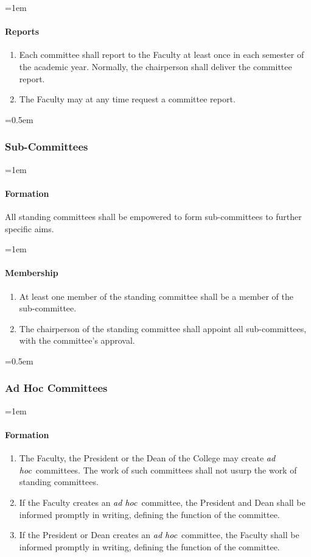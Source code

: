 \documentclass{manual}
\newcommand{\keyword}[1]{\textcolor{black}{#1}}
\newcommand{\adho}{\keyword{\textit{ad hoc}}~}
\let\oldsubsubsection\subsubsection
\renewcommand\subsubsection{\leftskip=0.5em\oldsubsubsection}
\let\oldparagraph\paragraph
\renewcommand\paragraph{\leftskip=1em\oldparagraph}
\newcommand{\itemLevelA}{\alph*.}
\newcommand{\itemRefA}{\alph*}
\begin{document}
\paragraph{Reports}

\begin{enumerate}[label=\itemLevelA,ref=\itemRefA]
\item Each committee shall report to the Faculty at least once in each semester of the academic year. Normally, the chairperson shall deliver the committee report.

\item The Faculty may at any time request a committee report. 
\end{enumerate}

\subsubsection{Sub-Committees}
\paragraph{Formation}
All standing committees shall be empowered to form sub-committees to further specific aims. 

\paragraph{Membership}
\begin{enumerate}[label=\itemLevelA,ref=\itemRefA]
\item At least one member of the standing committee shall be a member of the sub-committee.

\item The chairperson of the standing committee shall appoint all sub-committees, with the committee's approval.
\end{enumerate}

\subsubsection{Ad Hoc Committees}

\paragraph{Formation}
\begin{enumerate}[label=\itemLevelA,ref=\itemRefA]
\item The Faculty, the President or the Dean of the College may create \adho committees. The work of such committees shall not usurp the work of standing committees.

\item If the Faculty creates an \adho committee, the President and Dean shall be informed promptly in writing, defining the function of the committee.

\item If the President or Dean creates an \adho committee, the Faculty shall be informed promptly in writing, defining the function of the committee.
\end{enumerate}
\end{document}
